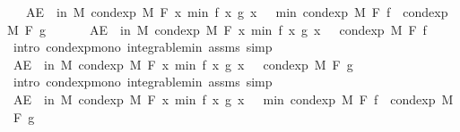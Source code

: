 \begin{isabellebody}
\ \ \ {\isachardoublequoteopen}AE\ {\isasymxi}\ in\ M{\isachardot}{\kern0pt}\ cond{\isacharunderscore}{\kern0pt}exp\ M\ F\ {\isacharparenleft}{\kern0pt}{\isasymlambda}x{\isachardot}{\kern0pt}\ min\ {\isacharparenleft}{\kern0pt}f\ x{\isacharparenright}{\kern0pt}\ {\isacharparenleft}{\kern0pt}g\ x{\isacharparenright}{\kern0pt}{\isacharparenright}{\kern0pt}\ {\isasymxi}\ {\isasymle}\ min\ {\isacharparenleft}{\kern0pt}cond{\isacharunderscore}{\kern0pt}exp\ M\ F\ f\ {\isasymxi}{\isacharparenright}{\kern0pt}\ {\isacharparenleft}{\kern0pt}cond{\isacharunderscore}{\kern0pt}exp\ M\ F\ g\ {\isasymxi}{\isacharparenright}{\kern0pt}{\isachardoublequoteclose}\isanewline
%
\isadelimproof
%
\endisadelimproof
%
\isatagproof
{}\isamarkupfalse%
\ {\isacharminus}{\kern0pt}\isanewline
\ \ \isamarkupfalse%
\ {\isachardoublequoteopen}AE\ {\isasymxi}\ in\ M{\isachardot}{\kern0pt}\ cond{\isacharunderscore}{\kern0pt}exp\ M\ F\ {\isacharparenleft}{\kern0pt}{\isasymlambda}x{\isachardot}{\kern0pt}\ min\ {\isacharparenleft}{\kern0pt}f\ x{\isacharparenright}{\kern0pt}\ {\isacharparenleft}{\kern0pt}g\ x{\isacharparenright}{\kern0pt}{\isacharparenright}{\kern0pt}\ {\isasymxi}\ {\isasymle}\ cond{\isacharunderscore}{\kern0pt}exp\ M\ F\ f\ {\isasymxi}{\isachardoublequoteclose}\ \isamarkupfalse%
\ {\isacharparenleft}{\kern0pt}intro\ cond{\isacharunderscore}{\kern0pt}exp{\isacharunderscore}{\kern0pt}mono\ integrable{\isacharunderscore}{\kern0pt}min\ assms{\isacharcomma}{\kern0pt}\ simp{\isacharparenright}{\kern0pt}\isanewline
\ \ \isamarkupfalse%
\ \isamarkupfalse%
\ {\isachardoublequoteopen}AE\ {\isasymxi}\ in\ M{\isachardot}{\kern0pt}\ cond{\isacharunderscore}{\kern0pt}exp\ M\ F\ {\isacharparenleft}{\kern0pt}{\isasymlambda}x{\isachardot}{\kern0pt}\ min\ {\isacharparenleft}{\kern0pt}f\ x{\isacharparenright}{\kern0pt}\ {\isacharparenleft}{\kern0pt}g\ x{\isacharparenright}{\kern0pt}{\isacharparenright}{\kern0pt}\ {\isasymxi}\ {\isasymle}\ cond{\isacharunderscore}{\kern0pt}exp\ M\ F\ g\ {\isasymxi}{\isachardoublequoteclose}\ \isamarkupfalse%
\ {\isacharparenleft}{\kern0pt}intro\ cond{\isacharunderscore}{\kern0pt}exp{\isacharunderscore}{\kern0pt}mono\ integrable{\isacharunderscore}{\kern0pt}min\ assms{\isacharcomma}{\kern0pt}\ simp{\isacharparenright}{\kern0pt}\isanewline
\ \ \isamarkupfalse%
\ \isamarkupfalse%
\ {\isachardoublequoteopen}AE\ {\isasymxi}\ in\ M{\isachardot}{\kern0pt}\ cond{\isacharunderscore}{\kern0pt}exp\ M\ F\ {\isacharparenleft}{\kern0pt}{\isasymlambda}x{\isachardot}{\kern0pt}\ min\ {\isacharparenleft}{\kern0pt}f\ x{\isacharparenright}{\kern0pt}\ {\isacharparenleft}{\kern0pt}g\ x{\isacharparenright}{\kern0pt}{\isacharparenright}{\kern0pt}\ {\isasymxi}\ {\isasymle}\ min\ {\isacharparenleft}{\kern0pt}cond{\isacharunderscore}{\kern0pt}exp\ M\ F\ f\ {\isasymxi}{\isacharparenright}{\kern0pt}\ {\isacharparenleft}{\kern0pt}cond{\isacharunderscore}{\kern0pt}exp\ M\ F\ g\ {\isasymxi}{\isacharparenright}{\kern0pt}{\isachardoublequoteclose}\ \isamarkupfalse%

\end{isabellebody}
